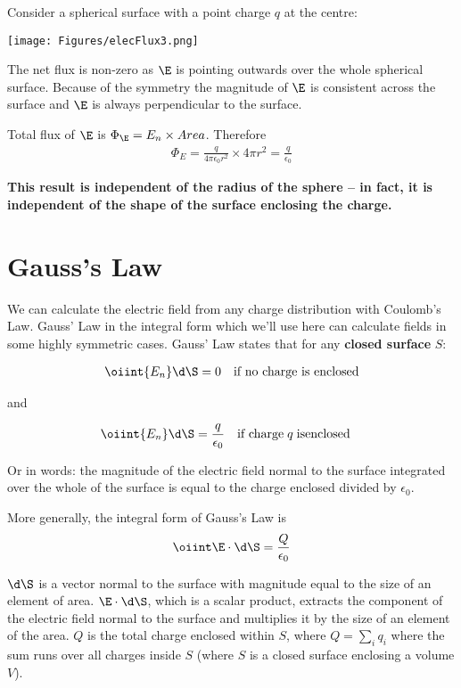 \documentclass[
]{book}
\theoremstyle{definition}
\theoremstyle{definition}
\theoremstyle{definition}
\theoremstyle{definition}
\theoremstyle{remark}
\begin{document}
Consider a spherical surface with a point charge \(q\) at the centre:

\texttt{[image: Figures/elecFlux3.png]} \protect\hypertarget{fig:elecFlux3}{}{}

The net flux is non-zero as \(\E\) is pointing outwards over the whole
spherical surface. Because of the symmetry the magnitude of \(\E\) is
consistent across the surface and \(\E\) is always perpendicular to the
surface.

Total flux of \(\E\) is \(\Phi_{\E} = E_n \times Area\). Therefore
\[\begin{aligned}
\Phi_E = \frac{q}{4\pi\epsilon_0 r^2} \times 4\pi r^2 = \frac{q}{\epsilon_0} 
\end{aligned}\]

\textbf{This result is independent of the radius of the sphere -- in fact, it
is independent of the shape of the surface enclosing the charge.}

\hypertarget{gausss-law}{%
\section{Gauss's Law}\label{gausss-law}}

We can calculate the electric field from any charge distribution with
Coulomb's Law. Gauss' Law in the integral form which we'll use here can
calculate fields in some highly symmetric cases. Gauss' Law states that
for any \textbf{closed surface} \(S\):

\[\begin{aligned}
\oiint{E_n} \d \S = 0   \quad \text{if no charge is enclosed}
\end{aligned}\]

and

\[\begin{aligned}
\oiint{E_n} \d \S &= \frac{q}{\epsilon_0} \quad  \text{if charge} \; q \; \mathrm{is enclosed}
\end{aligned}\]

Or in words: the magnitude of the electric field normal to the surface
integrated over the whole of the surface is equal to the charge enclosed
divided by \(\epsilon_0\).

More generally, the integral form of Gauss's Law is
\[\label{eq:GaussLaw} 
\oiint \E \cdot \d \S =\frac{Q}{\epsilon_0}\]

\(\d \S\) is a vector normal to the surface with magnitude equal to the
size of an element of area. \(\E \cdot \d \S\), which is a scalar product,
extracts the component of the electric field normal to the surface and
multiplies it by the size of an element of the area. \(Q\) is the total
charge enclosed within \(S\), where \(Q = \sum_i q_i\) where the sum runs
over all charges inside \(S\) (where \(S\) is a closed surface enclosing a
volume \(V\)).
\end{document}
